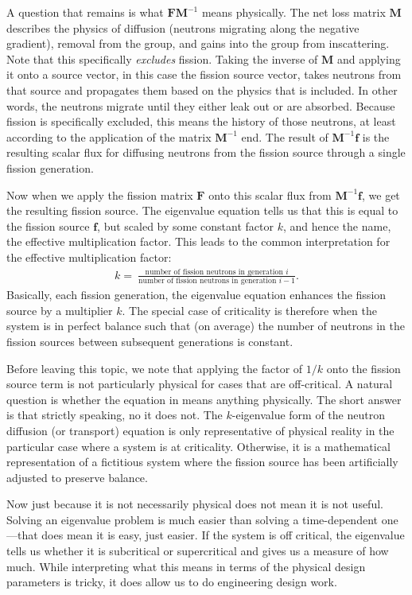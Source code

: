 A question that remains is what $\mathbf{F} \mathbf{M}^{-1}$ means physically. The net loss matrix $\mathbf{M}$ describes the physics of diffusion (neutrons migrating along the negative gradient), removal from the group, and gains into the group from inscattering. Note that this specifically \emph{excludes} fission. Taking the inverse of $\mathbf{M}$ and applying it onto a source vector, in this case the fission source vector, takes neutrons from that source and propagates them based on the physics that is included. In other words, the neutrons migrate until they either leak out or are absorbed. Because fission is specifically excluded, this means the history of those neutrons, at least according to the application of the matrix $\mathbf{M}^{-1}$ end. The result of $\mathbf{M}^{-1} \mathbf{f}$ is the resulting scalar flux for diffusing neutrons from the fission source through a single fission generation.

Now when we apply the fission matrix $\mathbf{F}$ onto this scalar flux from $\mathbf{M}^{-1} \mathbf{f}$, we get the resulting fission source. The eigenvalue equation tells us that this is equal to the fission source $\mathbf{f}$, but scaled by some constant factor $k$, and hence the name, the effective multiplication factor. This leads to the common interpretation for the effective multiplication factor:
\begin{align}
  k = \ \frac{\text{number of fission neutrons in generation $i$}}{\text{number of fission neutrons in generation $i-1$}} .
\end{align}
Basically, each fission generation, the eigenvalue equation enhances the fission source by a multiplier $k$. The special case of criticality is therefore when the system is in perfect balance such that (on average) the number of neutrons in the fission sources between subsequent generations is constant.

Before leaving this topic, we note that applying the factor of $1/k$ onto the fission source term is not particularly physical for cases that are off-critical. A natural question is whether the equation in means anything physically. The short answer is that strictly speaking, no it does not. The $k$-eigenvalue form of the neutron diffusion (or transport) equation is only representative of physical reality in the particular case where a system is at criticality. Otherwise, it is a mathematical representation of a fictitious system where the fission source has been artificially adjusted to preserve balance.

Now just because it is not necessarily physical does not mean it is not useful. Solving an eigenvalue problem is much easier than solving a time-dependent one---that does mean it is easy, just easier. If the system is off critical, the eigenvalue tells us whether it is subcritical or supercritical and gives us a measure of how much. While interpreting what this means in terms of the physical design parameters is tricky, it does allow us to do engineering design work.

